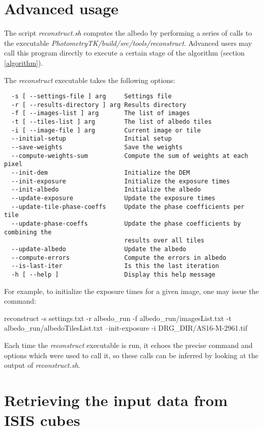 \documentclass[letterpaper,fleqn,11pt]{report}
\begin{document}
\section{Advanced usage}

The script {\it reconstruct.sh} computes the albedo by performing a
series of calls to the executable
{\it PhotometryTK/build/src/tools/reconstruct}. Advanced users may call this
program directly to execute a certain stage of the algorithm (section \ref{algorithm}).

The {\it reconstruct} executable takes the following options:

\begin{verbatim}
  -s [ --settings-file ] arg     Settings file
  -r [ --results-directory ] arg Results directory
  -f [ --images-list ] arg       The list of images
  -t [ --tiles-list ] arg        The list of albedo tiles
  -i [ --image-file ] arg        Current image or tile
  --initial-setup                Initial setup
  --save-weights                 Save the weights
  --compute-weights-sum          Compute the sum of weights at each pixel
  --init-dem                     Initialize the DEM
  --init-exposure                Initialize the exposure times
  --init-albedo                  Initialize the albedo
  --update-exposure              Update the exposure times
  --update-tile-phase-coeffs     Update the phase coefficients per tile
  --update-phase-coeffs          Update the phase coefficients by combining the
                                 results over all tiles
  --update-albedo                Update the albedo
  --compute-errors               Compute the errors in albedo
  --is-last-iter                 Is this the last iteration
  -h [ --help ]                  Display this help message
\end{verbatim}

For example, to initialize the exposure times for a given image, one may
issue the command:

reconstruct -s settings.txt -r albedo\_run -f albedo\_run/imagesList.txt -t albedo\_run/albedoTilesList.txt --init-exposure -i DRG\_DIR/AS16-M-2961.tif

Each time the {\it reconstruct} executable is run, it echoes the precise
command and options which were used to call it, so these calls can be
inferred by looking at the output of {\it reconstruct.sh}. 

\section{Retrieving the input data from ISIS cubes}
\end{document}
